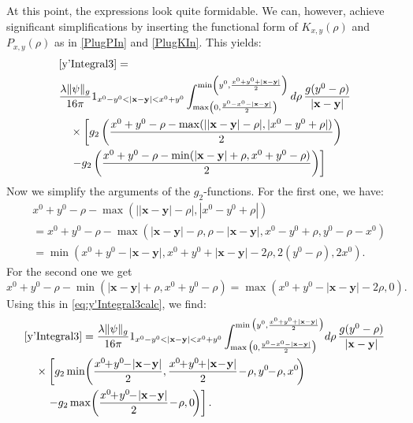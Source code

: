 \documentclass[b5paper,draft,openbib,12pt]{memoir}
\newcommand{\vx}{\mathbf{x}}
\newcommand{\vy}{\mathbf{y}}
\begin{document}
At this point, the expressions look quite formidable. 
We can, however, achieve significant simplifications 
by inserting the functional form of $K_{x,y}(\rho)$ 
and $P_{x,y}(\rho)$ as in \eqref{PlugPIn} and 
\eqref{PlugKIn}. This yields:
\begin{align}
  &\eqref{y'Integral3} =\notag\\
  &\frac{\lambda\|\psi\|_g}{16\pi} 1_{x^0-y^0<|\vx-\vy|<x^0+y^0}
  \int_{\max\left(0,\frac{y^0-x^0-|\vx-\vy|}{2}\right)}^{\min\left(y^0,\frac{x^0+y^0+|\vx-\vy|}{2} \right)}d\rho \, \frac{g(y^0-\rho)}{|\vx-\vy|}\nonumber\\ 
  &~~~\times\left[ g_2\left( \frac{x^0+y^0-\rho-\max(||\vx-\vy|-\rho|,|x^0-y^0+\rho|)}{2} \right)\right.\nonumber\\
  &~~~\left.-g_2\left( \frac{x^0+y^0-\rho-\min(|\vx-\vy|+\rho,x^0+y^0-\rho)}{2} \right)\right]
	\label{eq:y'Integral3calc}
\end{align}
Now we simplify the arguments of the $g_2$-functions. 
For the first one, we have:
\begin{align}
&x^0\!\!+\!y^0\!\!-\!\rho\!-\!\max(||\vx\!-\!\vy|\!-\!\rho|,|x^0\!\!-\!y^0\!\!+\!\rho|)\nonumber\\
&= x^0\!\!+\!y^0\!\!-\!\rho\! -\!\max ( |\vx\!-\!\vy|\!-\!\rho,\rho\!-\!|\vx\!-\!\vy|,x^0\!\!-\!y^0\!\!+\!\rho,y^0\!\!-\!\rho\!-\!x^0)\nonumber\\
&= \min\!\left(x^0\!\!+\!y^0\!\!-\!|\vx\!-\!\vy|,x^0\!\!+\!y^0\!\!+\!|\vx\!-\!\vy|\!-\!2\rho,2(y^0\!\!-\!\rho),2x^0 \right).
\end{align}
For the second one we get
\begin{equation}
	x^0\!\!+\!y^0\!\!-\rho-\!\min(|\vx\!-\!\vy|\!+\!\rho,x^0\!\!+\!y^0\!\!-\!\rho) = \max(x^0\!\!+\!y^0\!\!-\!|\vx\!-\!\vy|\!-\!2\rho,0).
\end{equation}
Using this in \eqref{eq:y'Integral3calc}, we find:
\begin{align}
    &\eqref{y'Integral3} =\frac{\lambda\|\psi\|_g}{16\pi} 
    1_{x^0-y^0<|\vx-\vy|<x^0+y^0}
    \int_{\max\big(0,\frac{y^0-x^0-|\vx-\vy|}{2}\big)}^{\min\big(y^0,\frac{x^0+y^0+|\vx-\vy|}{2} \big)}\!d\rho \, \frac{g(y^0-\rho)}{|\vx-\vy|}\nonumber\\
    &\quad\times \left[g_2 \min\!\left(\frac{x^0\!\!+\!y^0\!\!-\!|\vx\!-\!\vy|}{2},\frac{x^0\!\!+\!y^0\!\!+\!|\vx\!-\!\vy|}{2}\!-\!\rho,y^0\!\!-\!\rho,x^0 \!\right) \right.\nonumber\\
    &\quad \quad \left. -g_2 \max\!\left( \frac{x^0\!\!+\!y^0\!\!-\!|\vx\!-\!\vy|}{2}\!-\!\rho,0\!\right) \right].
\end{align}
\end{document}
